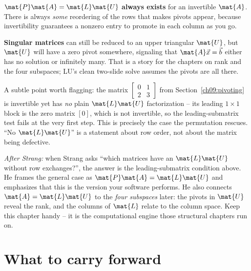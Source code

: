 \textbf{$\mat{P}\mat{A}=\mat{L}\mat{U}$ always exists} for an invertible $\mat{A}$. There is
always \emph{some} reordering of the rows that makes pivots appear, because invertibility
guarantees a nonzero entry to promote in each column as you go.

\textbf{Singular matrices} can still be reduced to an upper triangular $\mat{U}$, but $\mat{U}$
will have a zero pivot somewhere, signaling that $\mat{A}\vec{x}=\vec{b}$ either has no
solution or infinitely many. That is a story for the chapters on rank and the four
subspaces; LU's clean two-slide solve assumes the pivots are all there.

\begin{remark}
A subtle point worth flagging: the matrix $\begin{bmatrix}0&1\\2&3\end{bmatrix}$ from
Section~\ref{ch09:pivoting} is invertible yet has \emph{no} plain $\mat{L}\mat{U}$
factorization -- its leading $1\times 1$ block is the zero matrix $[0]$, which is not
invertible, so the leading-submatrix test fails at the very first step. This is precisely
the case the permutation rescues. ``No $\mat{L}\mat{U}$'' is a statement about row order, not
about the matrix being defective.
\end{remark}

\begin{strangbox}
\emph{After Strang:} when Strang asks ``which matrices have an $\mat{L}\mat{U}$ without row
exchanges?'', the answer is the leading-submatrix condition above. He frames the general
case as $\mat{P}\mat{A}=\mat{L}\mat{U}$ and emphasizes that this is the version your software
performs. He also connects $\mat{A}=\mat{L}\mat{U}$ to the \emph{four subspaces} later: the
pivots in $\mat{U}$ reveal the rank, and the columns of $\mat{L}$ relate to the column space.
Keep this chapter handy -- it is the computational engine those structural chapters run on.
\end{strangbox}

\section{What to carry forward}
\label{ch09:summary}

